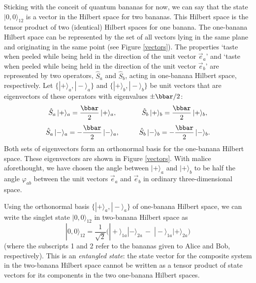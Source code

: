 Sticking with the conceit of quantum bananas for now, we can say that the state $|0, 0\rangle_{12}$ is a vector in the Hilbert space for two bananas. This Hilbert space is the tensor product of two (identical) Hilbert spaces for one banana. The one-banana Hilbert space can be represented by the set of all vectors lying in the same plane and originating in the same point (see Figure \ref{vectors}). The properties `taste when peeled while being held in the direction of the unit vector $\vec{e}_a$' and `taste when peeled while being held in the direction of the unit vector $\vec{e}_b$' are represented by two operators, $\hat{S}_a$ and $\hat{S}_b$, acting in one-banana Hilbert space, respectively. Let $\{ | + \rangle_a, | - \rangle_a \}$ and  $\{ | + \rangle_b, | - \rangle_b \}$ be unit vectors that are eigenvectors of these operators with eigenvalues $\pm \bbar/2$:
\begin{equation}
\begin{array}{ccc}
\hat{S}_a \, | + \rangle_a = \displaystyle{\frac{\bbar}{2}} \, | + \rangle_a, & & \hat{S}_b \, | + \rangle_b = \displaystyle{\frac{\bbar}{2}}  \, | + \rangle_b,   \\[.4cm]
\hat{S}_a \, | - \rangle_a = - \displaystyle{\frac{\bbar}{2}}  \, | - \rangle_a, & \quad & \hat{S}_b \, | - \rangle_b = - \displaystyle{\frac{\bbar}{2}}  \, | - \rangle_b.   
\end{array}
\label{eigenvectors}
\end{equation}
Both sets of eigenvectors form an orthonormal basis for the one-banana Hilbert space. These eigenvectors are shown in Figure  \ref{vectors}. With malice aforethought, we have chosen the angle between  $|+\rangle_a$ and $|+\rangle_b$ to be half the angle $\varphi_{ab}$ between the unit vectors $\vec{e}_a$ and $\vec{e}_b$ in ordinary three-dimensional space.  

Using the orthonormal basis $\{ |+ \rangle_a, |- \rangle_a \}$ of one-banana Hilbert space, we can write the singlet state $| 0, 0 \rangle_{12}$  in two-banana Hilbert space as  
 \begin{equation}
| 0, 0 \rangle_{12} = \frac{1}{\sqrt{2}} \Big( |+ \rangle_{1a} |- \rangle_{2a} \, - \; |-  \rangle_{1a} | + \rangle_{2a} \Big)
\label{singlet state s=1/2 simple}
\end{equation}
(where the subscripts 1 and 2 refer to the bananas given to Alice and Bob, respectively). This is an \emph{entangled state}: the state vector for the composite system in the two-banana Hilbert space cannot be written as a tensor product of state vectors for its components in the two one-banana Hilbert spaces.


